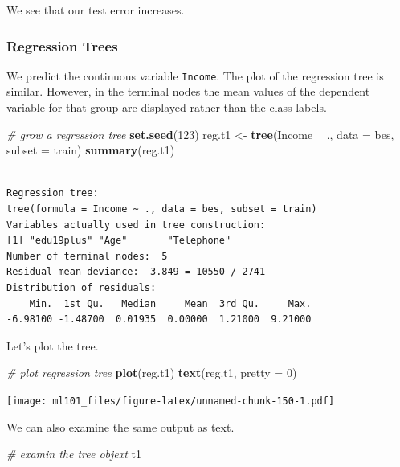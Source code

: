 \documentclass[]{article}
\newenvironment{Shaded}{\begin{snugshade}}{\end{snugshade}}
\newcommand{\CommentTok}[1]{\textcolor[rgb]{0.56,0.35,0.01}{\textit{#1}}}
\newcommand{\DataTypeTok}[1]{\textcolor[rgb]{0.13,0.29,0.53}{#1}}
\newcommand{\DecValTok}[1]{\textcolor[rgb]{0.00,0.00,0.81}{#1}}
\newcommand{\KeywordTok}[1]{\textcolor[rgb]{0.13,0.29,0.53}{\textbf{#1}}}
\newcommand{\NormalTok}[1]{#1}
\newcommand{\OperatorTok}[1]{\textcolor[rgb]{0.81,0.36,0.00}{\textbf{#1}}}
\newcommand{\StringTok}[1]{\textcolor[rgb]{0.31,0.60,0.02}{#1}}
\begin{document}
We see that our test error increases.

\hypertarget{regression-trees}{%
\subsubsection{Regression Trees}\label{regression-trees}}

We predict the continuous variable \texttt{Income}. The plot of the regression tree is similar. However, in the terminal nodes the mean values of the dependent variable for that group are displayed rather than the class labels.

\begin{Shaded}
\begin{Highlighting}[]
\CommentTok{# grow a regression tree}
\KeywordTok{set.seed}\NormalTok{(}\DecValTok{123}\NormalTok{)}
\NormalTok{reg.t1 <-}\StringTok{ }\KeywordTok{tree}\NormalTok{(Income }\OperatorTok{~}\StringTok{ }\NormalTok{., }\DataTypeTok{data =}\NormalTok{ bes, }\DataTypeTok{subset =}\NormalTok{ train)}
\KeywordTok{summary}\NormalTok{(reg.t1)}
\end{Highlighting}
\end{Shaded}

\begin{verbatim}

Regression tree:
tree(formula = Income ~ ., data = bes, subset = train)
Variables actually used in tree construction:
[1] "edu19plus" "Age"       "Telephone"
Number of terminal nodes:  5 
Residual mean deviance:  3.849 = 10550 / 2741 
Distribution of residuals:
    Min.  1st Qu.   Median     Mean  3rd Qu.     Max. 
-6.98100 -1.48700  0.01935  0.00000  1.21000  9.21000 
\end{verbatim}

Let's plot the tree.

\begin{Shaded}
\begin{Highlighting}[]
\CommentTok{# plot regression tree}
\KeywordTok{plot}\NormalTok{(reg.t1)}
\KeywordTok{text}\NormalTok{(reg.t1, }\DataTypeTok{pretty =} \DecValTok{0}\NormalTok{)}
\end{Highlighting}
\end{Shaded}

\texttt{[image: ml101\_files/figure-latex/unnamed-chunk-150-1.pdf]}

We can also examine the same output as text.

\begin{Shaded}
\begin{Highlighting}[]
\CommentTok{# examin the tree objext}
\NormalTok{t1}
\end{Highlighting}
\end{Shaded}
\end{document}
